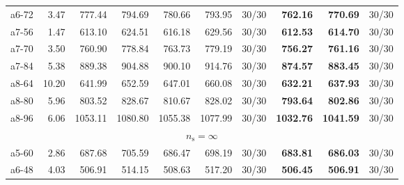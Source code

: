 \documentclass[aspectratio=1610]{beamer}
\begin{document}
\begin{frame}
\begin{table}[]
{\begin{tabular}{lrrrrrrrrr}
a6-72                                          & 3.47              & 777.44  & \multicolumn{1}{r|}{794.69}   & 780.66  & 793.95   & \multicolumn{1}{r|}{30/30} & \textbf{762.16}  & {\color[HTML]{FE0000} \textbf{770.69}}  & 30/30 \\
a7-56                                          & 1.47              & 613.10  & \multicolumn{1}{r|}{624.51}   & 616.18  & 629.56   & \multicolumn{1}{r|}{30/30} & \textbf{612.53}  & {\color[HTML]{FE0000} \textbf{614.70}}  & 30/30 \\
a7-70                                          & 3.50              & 760.90  & \multicolumn{1}{r|}{778.84}   & 763.73  & 779.19   & \multicolumn{1}{r|}{30/30} & \textbf{756.27}  & {\color[HTML]{FE0000} \textbf{761.16}}  & 30/30 \\
a7-84                                          & 5.38              & 889.38  & \multicolumn{1}{r|}{904.88}   & 900.10  & 914.76   & \multicolumn{1}{r|}{30/30} & \textbf{874.57}  & {\color[HTML]{FE0000} \textbf{883.45}}  & 30/30 \\
a8-64                                          & 10.20             & 641.99  & \multicolumn{1}{r|}{652.59}   & 647.01  & 660.08   & \multicolumn{1}{r|}{30/30} & \textbf{632.21}  & {\color[HTML]{FE0000} \textbf{637.93}}  & 30/30 \\
a8-80                                          & 5.96              & 803.52  & \multicolumn{1}{r|}{828.67}   & 810.67  & 828.02   & \multicolumn{1}{r|}{30/30} & \textbf{793.64}  & {\color[HTML]{FE0000} \textbf{802.86}}  & 30/30 \\
a8-96                                          & 6.06              & 1053.11 & \multicolumn{1}{r|}{1080.80}  & 1055.38 & 1077.99  & \multicolumn{1}{r|}{30/30} & \textbf{1032.76} & {\color[HTML]{FE0000} \textbf{1041.59}} & 30/30 \\ \hline
\multicolumn{10}{c}{$n_\mathrm{s} = \infty$}                                                                                                                                                                                        \\ \hline
a5-60                                          & 2.86              & 687.68  & \multicolumn{1}{r|}{705.59}   & 686.47  & 698.19   & \multicolumn{1}{r|}{30/30} & \textbf{683.81}  & {\color[HTML]{FE0000} \textbf{686.03}}  & 30/30 \\
a6-48                                          & 4.03              & 506.91  & \multicolumn{1}{r|}{514.15}   & 508.63  & 517.20   & \multicolumn{1}{r|}{30/30} & \textbf{506.45}  & {\color[HTML]{FE0000} \textbf{506.91}}  & 30/30 \\

\end{tabular}}
\end{table}
\end{frame}
\end{document}
